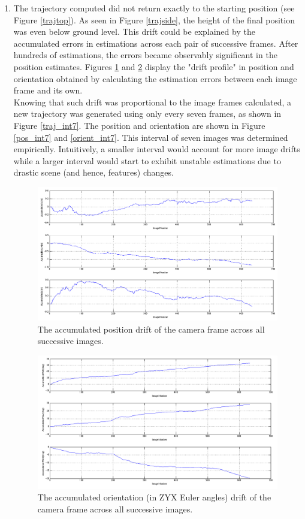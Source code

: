 \documentclass[12pt]{article} %
\begin{document}
\begin{enumerate}[label=\alph*)]
\item %
The trajectory computed did not return exactly to the starting position (see Figure \ref{trajtop}). As seen in Figure \ref{trajside}, the height of the final position was even below ground level. This drift could be explained by the accumulated errors in estimations across each pair of successive frames. After hundreds of estimations, the errors became observably significant in the position estimates. Figures \ref{pos_drift} and \ref{orient_drift} display the "drift profile" in position and orientation obtained by calculating the estimation errors between each image frame and its own.\\[12pt]
Knowing that such drift was proportional to the image frames calculated, a new trajectory was generated using only every seven frames, as shown in Figure \ref{traj_int7}. The position and orientation are shown in Figure \ref{pos_int7} and \ref{orient_int7}. This interval of seven images was determined empirically. Intuitively, a smaller interval would account for more image drifts while a larger interval would start to exhibit unstable estimations due to drastic scene (and hence, features) changes.

\newpage

\begin{figure}[h!]
	\centering
	\includegraphics[width=450px]{position_drift.png}
	\caption{The accumulated position drift of the camera frame across all successive images.}
	\label{pos_drift}
\end{figure}

\begin{figure}[h!]
	\centering
	\includegraphics[width=450px]{orientation_drift.png}
	\caption{The accumulated orientation (in ZYX Euler angles) drift of the camera frame across all successive images.}
	\label{orient_drift}
\end{figure}


\end{enumerate}
\end{document}
